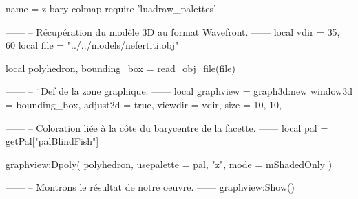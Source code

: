 \documentclass{standalone}
\begin{document}
\begin{luadraw}{name = z-bary-colmap}
require 'luadraw_palettes'

------
-- Récupération du modèle 3D au format Wavefront.
------
local vdir = {35, 60}
local file = "../../models/nefertiti.obj"

local polyhedron, bounding_box = read_obj_file(file)

------
-- ¨Def de la zone graphique.
------
local graphview = graph3d:new{
  window3d = bounding_box,
  adjust2d = true,
  viewdir  = vdir,
  size     = {10, 10},
}

------
-- Coloration liée à la côte du barycentre de la facette.
------
local pal = getPal["palBlindFish"]

graphview:Dpoly(
  polyhedron,
  {
    usepalette = {pal, "z"},
    mode       = mShadedOnly
  }
)

------
-- Montrons le résultat de notre oeuvre.
------
graphview:Show()
\end{luadraw}
\end{document}
